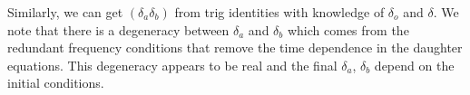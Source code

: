 Similarly, we can get $(\delta_a\delta_b)$ from trig identities with knowledge of $\delta_o$ and $\delta$. We note that there is a degeneracy between $\delta_a$ and $\delta_b$ which comes from the redundant frequency conditions that remove the time dependence in the daughter equations. This degeneracy appears to be real and the final $\delta_a$, $\delta_b$ depend on the initial conditions.

